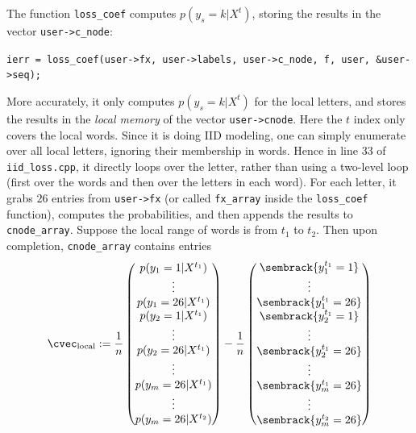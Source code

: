 \documentclass[11pt]{report}
\begin{document}
The function \verb!loss_coef! computes $p(y_s = k | X^t)$,
storing the results in the vector \verb!user->c_node!:

\vspace{-0.4em}
\verb!ierr = loss_coef(user->fx, user->labels, user->c_node, f, user, &user->seq);!
\vspace{-0.4em}

More accurately, it only computes $p(y_s = k | X^t)$ for the local letters,
and stores the results in the \emph{local memory} of the vector \verb!user->cnode!.
Here the $t$ index only covers the local words.
Since it is doing IID modeling,
one can simply enumerate over all local letters, ignoring their membership in words.
Hence in line 33 of \verb!iid_loss.cpp!, it directly loops over the letter,
rather than using a two-level loop (first over the words and then over the letters in each word).
For each letter, it grabs $26$ entries from \verb!user->fx!
(or called \verb!fx_array! inside the \verb!loss_coef! function),
computes the probabilities,
and then appends the results to \verb!cnode_array!.
Suppose the local range of words is from $t_1$ to $t_2$.
Then upon completion, \verb!cnode_array! contains entries
\begin{align}
\label{eq:def_c_local}
  \cvec_{\text{local}} :=
    \frac{1}{n}
    \begin{pmatrix}
    p(y_1 = 1 | X^{t_1}) \\
    \vdots \\
    p(y_1 = 26 | X^{t_1})  \\
    p(y_2 = 1| X^{t_1})  \\
    \vdots \\
    p(y_2 = 26 | X^{t_1})   \\
    \vdots \\
    p(y_m = 26 | X^{t_1})   \\
    \vdots \\
    p(y_m = 26 | X^{t_2})
  \end{pmatrix}
  -
  \frac{1}{n}
  \begin{pmatrix}
    \sembrack{y^{t_1}_1 = 1} \\
    \vdots \\
    \sembrack{y^{t_1}_1 = 26} \\
    \sembrack{y^{t_1}_2 = 1} \\
    \vdots \\
    \sembrack{y^{t_1}_2 = 26} \\
    \vdots \\
    \sembrack{y^{t_1}_m = 26} \\
    \vdots \\
    \sembrack{y^{t_2}_m = 26}
  \end{pmatrix}
\end{align}
\end{document}
